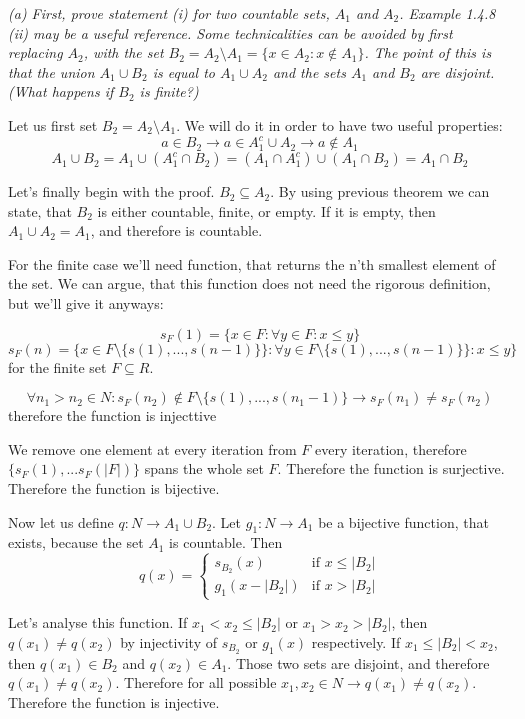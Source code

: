 \documentclass[11pt,oneside,titlepage]{book}
\begin{document}
\textit{(a) First, prove statement (i) for two countable sets, $A_1$ and $A_2$.
  Example 1.4.8 (ii) may be a useful reference. Some technicalities can be
  avoided by first replacing $A_2$, with the set $B_2 = A_2 \setminus A_1
  = \{x \in A_2: x \notin A_1\}$. The point of this is that the union
  $A_1 \cup B_2$ is equal to $A_1 \cup A_2$ and the sets $A_1$ and $B_2$ are
  disjoint. (What happens if $B_2$ is finite?)}

Let us first set $B_2 = A_2 \setminus A_1$. We will do it in order to have two
useful properties:
$$a \in B_2 \to a \in A_1^c \cup A_2 \to a \notin A_1$$
$$A_1 \cup B_2 = A_1 \cup (A_1^c \cap B_2) = (A_1 \cap A_1^c) \cup (A_1 \cap
B_2) = A_1 \cap B_2$$

Let's finally begin with the proof.  $B_2 \subseteq A_2$. By using
previous theorem we can state, that $B_2$ is either countable, finite, or
empty. If it is empty, then $A_1 \cup A_2 = A_1$, and therefore is countable.

For the finite case we'll need function, that returns the n'th smallest
element of the set. We can argue, that this function does not need the
rigorous definition, but we'll give it anyways:

$$s_F(1) = \{x \in F: \forall y \in F: x \leq y\}$$
$$s_F(n) = \{x \in F \setminus \{s(1),...,s(n - 1)\}\}: \forall y \in F \setminus \{s(1),...,s(n - 1)\}\}: x \leq y\}$$
for the finite set $F \subseteq R$.

$$\forall n_1 > n_2 \in N: s_F(n_2) \notin F \setminus \{s(1),...,s(n_1 - 1)\}
\to s_F(n_1) \neq s_F(n_2)$$
therefore the function is injecttive

We remove one element at every iteration from $F$ every iteration, therefore
$\{s_F(1),...s_F(|F|)\}$ spans the whole set $F$. Therefore the function is
surjective. Therefore the function is bijective.

Now let us define $q: N \to A_1 \cup B_2$. Let $g_1: N \to A_1$ be a bijective
function, that exists, because the set $A_1$ is countable. Then 
\begin{equation}
  q(x)=
  \begin{cases}
    s_{B_2}(x) & \text{if } x \leq |B_2|\\
    g_1(x - |B_2|) & \text{if } x > |B_2|
  \end{cases}
\end{equation}

Let's analyse this function. If $x_1 < x_2 \leq |B_2|$ or $x_1 > x_2 > |B_2|$,
then $q(x_1) \neq q(x_2)$ by injectivity of $s_{B_2}$ or $g_1(x)$ respectively.
If $x_1 \leq |B_2| < x_2$, then $q(x_1) \in B_2$ and $q(x_2) \in A_1$. Those
two sets are disjoint, and therefore $q(x_1) \neq q(x_2)$. Therefore for
all possible $x_1,x_2 \in N \to q(x_1) \neq q(x_2)$. Therefore the function
is injective.
\end{document}
